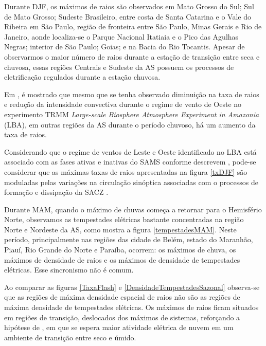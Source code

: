 
Durante DJF, os máximos de raios são observados em Mato Grosso do Sul; Sul de Mato Grosso; Sudeste Brasileiro, entre costa de Santa Catarina e o Vale do Ribeira em São Paulo, região de fronteira entre São Paulo, Minas Gerais e Rio de Janeiro, aonde localiza-se o Parque Nacional Itatiaia e o Pico das Agulhas Negras; interior de São Paulo; Goias; e na Bacia do Rio Tocantis. Apesar de observarmos o maior número de raios durante a estação de transição entre seca e chuvosa, essas regiões Centrais e Sudeste da AS possuem os processos de eletrificação regulados durante a estação chuvosa. 

Em , é mostrado que mesmo que se tenha observado diminuição na taxa de raios e redução da intensidade convectiva durante o regime de vento de Oeste no experimento TRMM \textit{Large-scale Biosphere Atmosphere Experiment in Amazonia} (LBA), em outras regiões da AS durante o período chuvoso, há um aumento da taxa de raios.

Considerando que o regime de ventos de Leste e Oeste identificado no LBA está associado com as fases ativas e inativas do SAMS conforme descrevem , pode-se considerar que as máximas taxas de raios apresentadas na figura \ref{txDJF} são moduladas pelas variações na circulação sinóptica associadas com o processos de formação e dissipação da SACZ \cite{petersen2002trmm,albrecht2011,silva2002lba}.

Durante MAM, quando o máximo de chuvas começa a retornar para o Hemisfério Norte, observamos as tempestades elétricas bastante concentradas na região Norte e Nordeste da AS, como mostra a figura \ref{tempestadesMAM}. Neste período, principalmente nas regiões das cidade de Belém, estado do Maranhão, Piauí, Rio Grande do Norte e Paraíba,  ocorrem: os máximos de chuva, os máximos de densidade de raios e os máximos de densidade de tempestades elétricas. Esse sincronismo não é comum.

Ao comparar as figuras \ref{TaxaFlash} e \ref{DensidadeTempestadesSazonal} observa-se que as regiões de máxima densidade espacial de raios não são as regiões de máxima densidade de tempestades elétricas. Os máximos de raios ficam situados em regiões de transição, deslocados dos máximos de sistemas, reforçando a hipótese de , em que se espera maior atividade elétrica de nuvem em um ambiente de transição entre seco e úmido.

